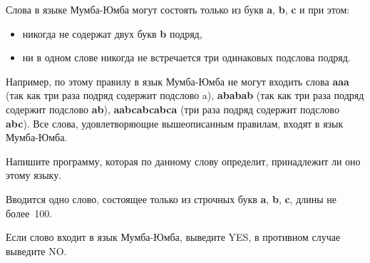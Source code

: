 Слова в языке Мумба-Юмба могут состоять только из букв {\bf a}, {\bf b}, {\bf c} и при этом:

\begin{itemize}
\item никогда не содержат двух букв {\bf b} подряд,
\item ни в одном слове никогда не встречается три одинаковых подслова подряд.
\end{itemize}

Например, по этому правилу в язык Мумба-Юмба не могут входить слова {\bf aaa}
(так как три раза подряд содержит подслово a), {\bf ababab} (так как три раза
подряд содержит подслово {\bf ab}), {\bf aabcabcabca} (три раза подряд содержит подслово {\bf abc}).
Все слова, удовлетворяющие вышеописанным правилам, входят в язык Мумба-Юмба.

Напишите программу, которая по данному слову определит, принадлежит ли оно этому языку.

\InputFile
Вводится одно слово, состоящее только из строчных букв {\bf a}, {\bf b}, {\bf c},
длины не более~100.

\OutputFile
Если слово входит в язык Мумба-Юмба, выведите YES, в противном случае выведите NO.
